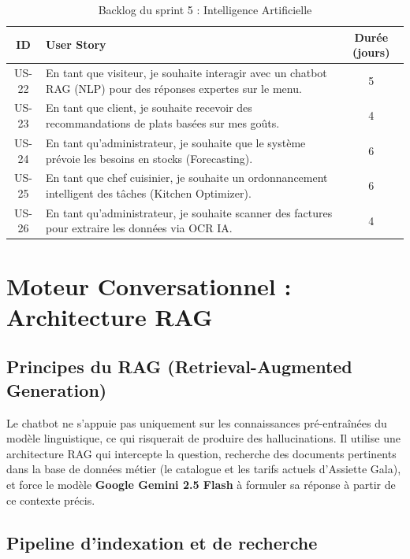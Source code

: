 \begin{table}[H]
    \centering
    \caption{Backlog du sprint 5 : Intelligence Artificielle}
    \label{tab:backlog_sprint5_ia}
    \renewcommand{\arraystretch}{1.3}
    \begin{tabular}{|c|p{8.5cm}|c|}
        \hline
        \textbf{ID} & \textbf{User Story} & \textbf{Durée (jours)} \\
        \hline
        US-22 & En tant que visiteur, je souhaite interagir avec un chatbot RAG (NLP) pour des réponses expertes sur le menu. & 5 \\
        \hline
        US-23 & En tant que client, je souhaite recevoir des recommandations de plats basées sur mes goûts. & 4 \\
        \hline
        US-24 & En tant qu'administrateur, je souhaite que le système prévoie les besoins en stocks (Forecasting). & 6 \\
        \hline
        US-25 & En tant que chef cuisinier, je souhaite un ordonnancement intelligent des tâches (Kitchen Optimizer). & 6 \\
        \hline
        US-26 & En tant qu'administrateur, je souhaite scanner des factures pour extraire les données via OCR IA. & 4 \\
        \hline
    \end{tabular}
\end{table}

\section{Moteur Conversationnel : Architecture RAG}

\subsection{Principes du RAG (Retrieval-Augmented Generation)}

Le chatbot ne s'appuie pas uniquement sur les connaissances pré-entraînées du modèle linguistique, ce qui risquerait de produire des hallucinations. Il utilise une architecture RAG qui intercepte la question, recherche des documents pertinents dans la base de données métier (le catalogue et les tarifs actuels d'Assiette Gala), et force le modèle \textbf{Google Gemini 2.5 Flash} à formuler sa réponse à partir de ce contexte précis.

\subsection{Pipeline d'indexation et de recherche}

